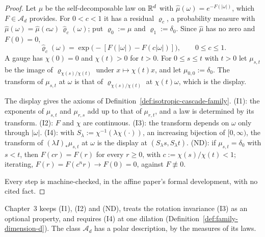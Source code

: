 \begin{proof}
\leanok
Let $\mu$ be the self-decomposable law on $\mathbb{R}^d$ with $\widehat\mu(\omega) = e^{-F(|\omega|)}$,
which $F \in \mathcal{A}_d$ provides. For $0 < c < 1$ it has a residual $\varrho_c$, a probability
measure with $\widehat\mu(\omega) = \widehat\mu(c\omega)\,\widehat\varrho_c(\omega)$; put
$\varrho_0 := \mu$ and $\varrho_1 := \delta_0$. Since $\widehat\mu$ has no zero and $F(0) = 0$,
\[
  \widehat\varrho_c(\omega) = \exp\bigl(-[F(|\omega|) - F(c|\omega|)]\bigr), \qquad 0 \le c \le 1 .
\]
A gauge has $\chi(0) = 0$ and $\chi(t) > 0$ for $t > 0$. For $0 \le s \le t$ with $t > 0$ let
$\mu_{s,t}$ be the image of $\varrho_{\chi(s)/\chi(t)}$ under $x \mapsto \chi(t)x$, and let
$\mu_{0,0} := \delta_0$. The transform of $\mu_{s,t}$ at $\omega$ is that of $\varrho_{\chi(s)/\chi(t)}$
at $\chi(t)\omega$, which is the display.

The display gives the axioms of Definition~\ref{def:isotropic-cascade-family}. (I1): the exponents
of $\mu_{s,t}$ and $\mu_{r,s}$ add up to that of $\mu_{r,t}$, and a law is determined by its
transform. (I2): $F$ and $\chi$ are continuous. (I3): the transform depends on $\omega$ only through
$|\omega|$. (I4): with $S_\lambda := \chi^{-1}(\lambda\chi(\cdot))$, an increasing bijection of
$[0,\infty)$, the transform of $(\lambda I)_*\mu_{s,t}$ at $\omega$ is the display at
$(S_\lambda s, S_\lambda t)$. (ND): if $\mu_{s,t} = \delta_0$ with $s < t$, then $F(cr) = F(r)$ for
every $r \ge 0$, with $c := \chi(s)/\chi(t) < 1$; iterating, $F(r) = F(c^nr) \to F(0) = 0$, against
$F \not\equiv 0$.

Every step is machine-checked, in the affine paper's formal development, with no cited fact.
\end{proof}

Chapter~3 keeps (I1), (I2) and (ND), treats the rotation invariance (I3) as an optional property,
and requires (I4) at one dilation (Definition~\ref{def:family-dimension-d}). The class $\mathcal{A}_d$
has a polar description, by the \Levy{} measures of its laws.

